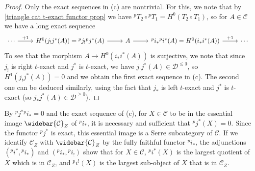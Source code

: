 \begin{proof}
Only the exact sequences in (c) are nontrivial. For this, we note that by \cref{triangle cat t-exact functor prop} we have ${^pT_2}\circ{^pT_1}=H^0(T_2\circ T_1)$, so for $A\in\mathcal{C}$ we have a long exact sequence
\[\begin{tikzcd}
\cdots\ar[r,"+1"]&H^0(j_!j^*(A))={^pj_!}{^pj^*}(A)\ar[r]&A\ar[r]&{^pi_*}{^pi^*}(A)=H^0(i_*i^*(A))\ar[r,"+1"]&\cdots
\end{tikzcd}\]
To see that the morphism $A\to H^0(i_*i^*(A))$ is surjective, we note that since $j_!$ is right $t$-exact and $j^*$ is $t$-exact, we have $j_!j^*(A)\in\mathcal{D}^{\leq 0}$, so $H^1(j_!j^*(A))=0$ and we obtain the first exact sequence in (c). The second one can be deduced similarly, using the fact that $j_*$ is left $t$-exact and $j^*$ is $t$-exact (so $j_*j^*(A)\in\mathcal{D}^{\geq 0}$).
\end{proof}

\begin{remark}\label{triangle car recollement ^pi_* adjoint char}
By ${^pj^*}{^pi_*}=0$ and the exact sequence of (c), for $X\in\mathcal{C}$ to be in the essential image $\widebar{\mathcal{C}}_Z$ of ${^pi_*}$, it is necessary and sufficient that ${^pj^*}(X)=0$. Since the functor ${^pj^*}$ is exact, this essential image is a Serre subcategory of $\mathcal{C}$. If we identify $\mathcal{C}_Z$ with $\widebar{\mathcal{C}}_Z$ by the fully faithful functor ${^pi_*}$, the adjunctions $({^pi^*},{^pi_*})$ and $({^pi_*},{^pi_!})$ show that for $X\in\mathcal{C}$, ${^pi^*}(X)$ is the largest quotient of $X$ which is in $\mathcal{C}_Z$, and ${^pi^!}(X)$ is the largest sub-object of $X$ that is in $\mathcal{C}_Z$.
\end{remark}

